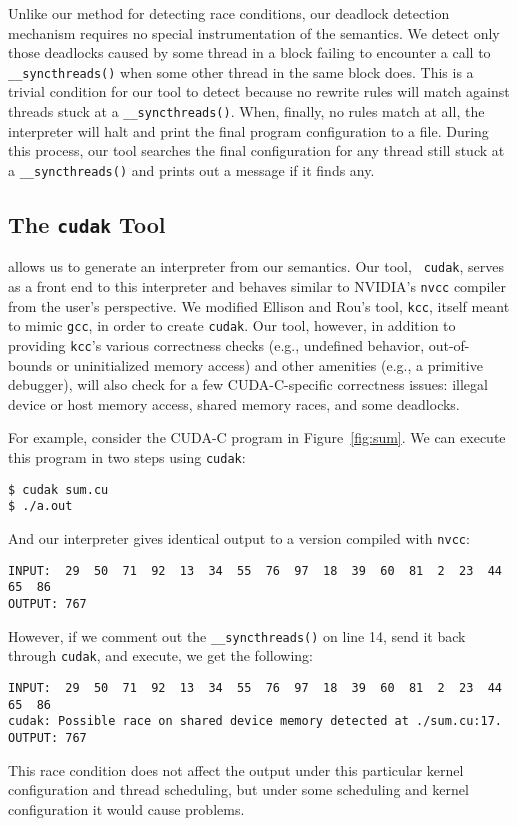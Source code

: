 Unlike our method for detecting race conditions, our deadlock detection
mechanism requires no special instrumentation of the semantics. We detect only
those deadlocks caused by some thread in a block failing to encounter a call to
{\tt \_\_syncthreads()} when some other thread in the same block does. This is a
trivial condition for our tool to detect because no rewrite rules will match
against threads stuck at a {\tt \_\_syncthreads()}. When, finally, no rules
match at all, the interpreter will halt and print the final program
configuration to a file. During this process, our tool searches the final
configuration for any thread still stuck at a {\tt \_\_syncthreads()} and prints
out a message if it finds any.

\subsection{The {\tt cudak} Tool}
\K allows us to generate an interpreter from our semantics. Our tool, {\tt
cudak}, serves as a front end to this interpreter and behaves similar to
NVIDIA's {\tt nvcc} compiler from the user's perspective. We modified Ellison
and Rou's tool, {\tt kcc}, itself meant to mimic {\tt gcc}, in order to
create {\tt cudak}. Our tool, however, in addition to providing {\tt kcc}'s
various correctness checks (e.g., undefined behavior, out-of-bounds or
uninitialized memory access) and other \K amenities (e.g., a primitive
debugger), will also check for a few CUDA-C-specific correctness issues: illegal
device or host memory access, shared memory races, and some deadlocks.

For example, consider the CUDA-C program in Figure~\ref{fig:sum}. We can execute
this program in two steps using {\tt cudak}:
\begin{verbatim}
$ cudak sum.cu
$ ./a.out
\end{verbatim}
And our interpreter gives identical output to a version compiled with {\tt nvcc}:
\begin{verbatim}
INPUT:  29  50  71  92  13  34  55  76  97  18  39  60  81  2  23  44  65  86
OUTPUT: 767
\end{verbatim}
However, if we comment out the {\tt \_\_syncthreads()} on line 14, send it back
through {\tt cudak}, and execute, we get the following:
\begin{verbatim}
INPUT:  29  50  71  92  13  34  55  76  97  18  39  60  81  2  23  44  65  86
cudak: Possible race on shared device memory detected at ./sum.cu:17.
OUTPUT: 767
\end{verbatim}
This race condition does not affect the output under this particular kernel
configuration and thread scheduling, but under some scheduling and kernel
configuration it would cause problems.

